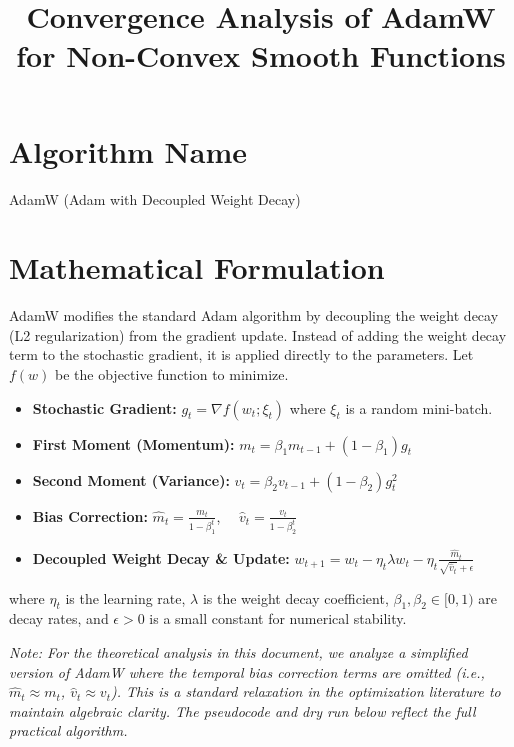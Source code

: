 \documentclass[11pt]{article}
\title{\textbf{Convergence Analysis of AdamW for Non-Convex Smooth Functions}}
\date{}
\begin{document}
\maketitle

\section*{Algorithm Name}
AdamW (Adam with Decoupled Weight Decay)

\section*{Mathematical Formulation}
AdamW modifies the standard Adam algorithm by decoupling the weight decay (L2 regularization) from the gradient update. Instead of adding the weight decay term to the stochastic gradient, it is applied directly to the parameters. Let $f(w)$ be the objective function to minimize.
\begin{itemize}
    \item \textbf{Stochastic Gradient:} $g_t = \nabla f(w_t; \xi_t)$ where $\xi_t$ is a random mini-batch.
    \item \textbf{First Moment (Momentum):} $m_t = \beta_1 m_{t-1} + (1-\beta_1) g_t$
    \item \textbf{Second Moment (Variance):} $v_t = \beta_2 v_{t-1} + (1-\beta_2) g_t^2$
    \item \textbf{Bias Correction:} $\hat{m}_t = \frac{m_t}{1-\beta_1^t}$, $\quad \hat{v}_t = \frac{v_t}{1-\beta_2^t}$
    \item \textbf{Decoupled Weight Decay \& Update:} $w_{t+1} = w_t - \eta_t \lambda w_t - \eta_t \frac{\hat{m}_t}{\sqrt{\hat{v}_t} + \epsilon}$
\end{itemize}
where $\eta_t$ is the learning rate, $\lambda$ is the weight decay coefficient, $\beta_1, \beta_2 \in [0, 1)$ are decay rates, and $\epsilon > 0$ is a small constant for numerical stability.

\textit{Note: For the theoretical analysis in this document, we analyze a simplified version of AdamW where the temporal bias correction terms are omitted (i.e., $\hat{m}_t \approx m_t$, $\hat{v}_t \approx v_t$). This is a standard relaxation in the optimization literature to maintain algebraic clarity. The pseudocode and dry run below reflect the full practical algorithm.}
\end{document}

